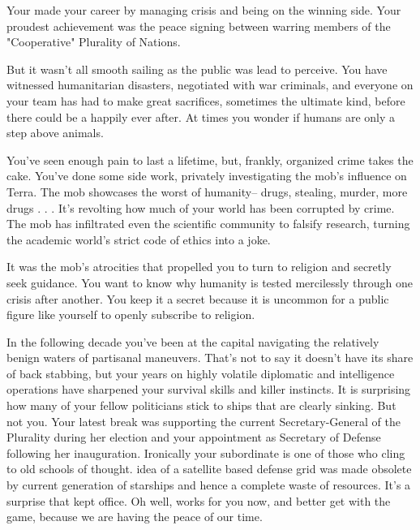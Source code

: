 \documentclass[char]{guildcamp3}
\begin{document}
\name{\cPoliOne{}}






Your made your career by managing crisis and being on the winning side. Your proudest achievement was the peace signing between warring members of the "Cooperative" Plurality of Nations.  

But it wasn't all smooth sailing as the public was lead to perceive. You have witnessed humanitarian disasters, negotiated with war criminals, and everyone on your team has had to make great sacrifices, sometimes the ultimate kind, before there could be a happily ever after. At times you wonder if humans are only a step above animals. 

You've seen enough pain to last a lifetime, but, frankly, organized crime takes the cake. You've done some side work, privately investigating the mob's influence on Terra. The mob showcases the worst of humanity-- drugs, stealing, murder, more drugs . . . It's revolting how much of your world has been corrupted by crime. The mob has infiltrated even the scientific community to falsify research, turning the academic world's strict code of ethics into a joke.

It was the mob's atrocities that propelled you to turn to religion and secretly seek guidance. You want to know why humanity is tested mercilessly through one crisis after another. You keep it a secret because it is uncommon for a public figure like yourself to openly subscribe to religion. 

In the following decade you've been at the capital navigating the relatively benign waters of partisanal maneuvers. That's not to say it doesn't have its share of back stabbing, but your years on highly volatile diplomatic and intelligence operations have sharpened your survival skills and killer instincts. It is surprising how many of your fellow politicians stick to ships that are clearly sinking. But not you. Your latest break was supporting the current Secretary-General of the Plurality during her election and your appointment as Secretary of Defense following her inauguration. Ironically your subordinate \cPoliTwo{\intro} is one of those who cling to old schools of thought. \cPoliTwo{\Their} idea of a satellite based defense grid was made obsolete by current generation of starships and hence a complete waste of resources. It's a surprise that \cPoliTwo{\they} kept \cPoliTwo{\their} office. Oh well, \cPoliTwo{\they} works for you now, and  better get with the game, because we are having the peace of our time.
\end{document}
